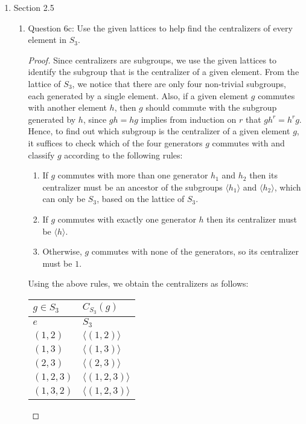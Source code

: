 \documentclass{article}
\begin{document}
\begin{enumerate}
  \item Section 2.5
    \begin{enumerate}
      \item Question 6c: Use the given lattices to help find the
        centralizers of every element in $S_3$.
        \begin{proof}
          Since centralizers are subgroups, we use the given lattices to
          identify the subgroup that is the centralizer of a given element.
          From the lattice of $S_3$, we notice that there are only four
          non-trivial subgroups, each generated by a single element. Also,
          if a given element $g$ commutes with another element $h$, then
          $g$ should commute with the subgroup generated by $h$, since
          $gh=hg$ implies from induction on $r$ that $gh^r=h^rg$. Hence, to
          find out which subgroup is the centralizer of a given element
          $g$, it suffices to check which of the four generators $g$
          commutes with and classify $g$ according to the following rules:
          \begin{enumerate}
            \item If $g$ commutes with more than one generator $h_1$ and
              $h_2$ then its centralizer must be an ancestor of the
              subgroups $\langle h_1\rangle$ and $\langle h_2\rangle$,
              which can only be $S_3$, based on the lattice of $S_3$.
            \item If $g$ commutes with exactly one generator $h$ then its
              centralizer must be $\langle h\rangle$.
            \item Otherwise, $g$ commutes with none of the generators, so
              its centralizer must be $1$.
          \end{enumerate}

          Using the above rules, we obtain the centralizers as follows:
          \begin{center}
            \begin{tabular}{|l|l|}
              \hline
              $g\in S_3$  & $C_{S_3}(g)$              \\ \hline\hline
              $e$         & $S_3$                     \\ \hline
              $(1,2)$     & $\langle(1,2)\rangle$     \\ \hline
              $(1,3)$     & $\langle(1,3)\rangle$     \\ \hline
              $(2,3)$     & $\langle(2,3)\rangle$     \\ \hline
              $(1,2,3)$   & $\langle(1,2,3)\rangle$   \\ \hline
              $(1,3,2)$   & $\langle(1,2,3)\rangle$   \\ \hline
            \end{tabular}
          \end{center}
        \end{proof}


\end{enumerate}
\end{enumerate}
\end{document}
